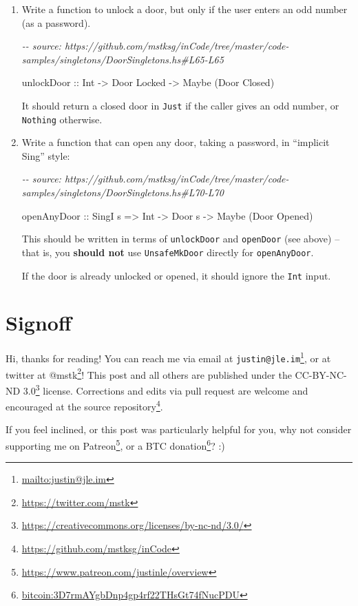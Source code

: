 \documentclass[]{article}
\newenvironment{Shaded}{}{}
\newcommand{\CommentTok}[1]{\textcolor[rgb]{0.38,0.63,0.69}{\textit{#1}}}
\newcommand{\DataTypeTok}[1]{\textcolor[rgb]{0.56,0.13,0.00}{#1}}
\newcommand{\NormalTok}[1]{#1}
\newcommand{\OtherTok}[1]{\textcolor[rgb]{0.00,0.44,0.13}{#1}}
\renewcommand{\href}[2]{#2\footnote{\url{#1}}}
\begin{document}
\begin{enumerate}
\def\labelenumi{\arabic{enumi}.}
\item
  Write a function to unlock a door, but only if the user enters an odd number
  (as a password).

\begin{Shaded}
\begin{Highlighting}[]
\CommentTok{{-}{-} source: https://github.com/mstksg/inCode/tree/master/code{-}samples/singletons/DoorSingletons.hs\#L65{-}L65}

\OtherTok{unlockDoor ::} \DataTypeTok{Int} \OtherTok{{-}>} \DataTypeTok{Door} \DataTypeTok{\textquotesingle{}Locked} \OtherTok{{-}>} \DataTypeTok{Maybe}\NormalTok{ (}\DataTypeTok{Door} \DataTypeTok{\textquotesingle{}Closed}\NormalTok{)}
\end{Highlighting}
\end{Shaded}

  It should return a closed door in \texttt{Just} if the caller gives an odd
  number, or \texttt{Nothing} otherwise.
\item
  Write a function that can open any door, taking a password, in ``implicit
  Sing'' style:

\begin{Shaded}
\begin{Highlighting}[]
\CommentTok{{-}{-} source: https://github.com/mstksg/inCode/tree/master/code{-}samples/singletons/DoorSingletons.hs\#L70{-}L70}

\OtherTok{openAnyDoor ::} \DataTypeTok{SingI}\NormalTok{ s }\OtherTok{=>} \DataTypeTok{Int} \OtherTok{{-}>} \DataTypeTok{Door}\NormalTok{ s }\OtherTok{{-}>} \DataTypeTok{Maybe}\NormalTok{ (}\DataTypeTok{Door} \DataTypeTok{\textquotesingle{}Opened}\NormalTok{)}
\end{Highlighting}
\end{Shaded}

  This should be written in terms of \texttt{unlockDoor} and \texttt{openDoor}
  (see above) -- that is, you \textbf{should not} use \texttt{UnsafeMkDoor}
  directly for \texttt{openAnyDoor}.

  If the door is already unlocked or opened, it should ignore the \texttt{Int}
  input.
\end{enumerate}

\hypertarget{signoff}{%
\section{Signoff}\label{signoff}}

Hi, thanks for reading! You can reach me via email at
\href{mailto:justin@jle.im}{\nolinkurl{justin@jle.im}}, or at twitter at
\href{https://twitter.com/mstk}{@mstk}! This post and all others are published
under the \href{https://creativecommons.org/licenses/by-nc-nd/3.0/}{CC-BY-NC-ND
3.0} license. Corrections and edits via pull request are welcome and encouraged
at \href{https://github.com/mstksg/inCode}{the source repository}.

If you feel inclined, or this post was particularly helpful for you, why not
consider \href{https://www.patreon.com/justinle/overview}{supporting me on
Patreon}, or a \href{bitcoin:3D7rmAYgbDnp4gp4rf22THsGt74fNucPDU}{BTC donation}?
:)
\end{document}
